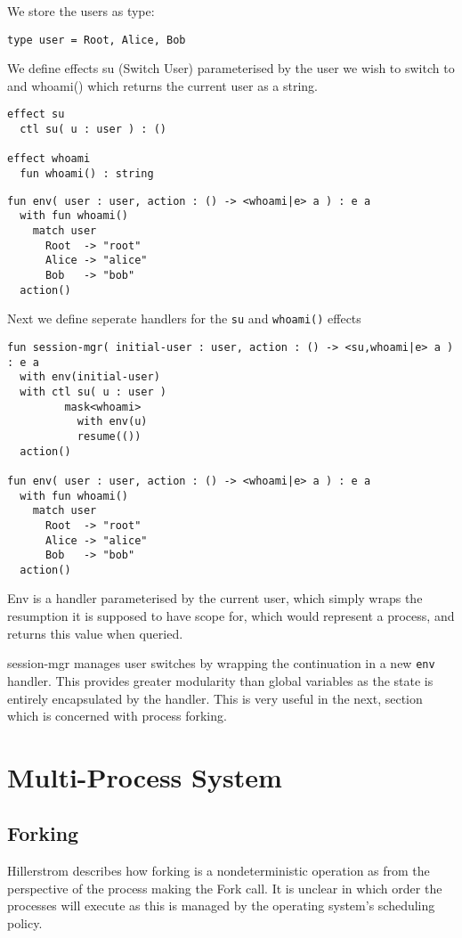 \documentclass[logo,bsc,singlespacing,parskip]{infthesis}
\begin{document}
We store the users as type:
\begin{lstlisting}
type user = Root, Alice, Bob
\end{lstlisting}

We define effects su (Switch User) parameterised by the user we wish to switch to and whoami() which returns the current user as a string.
\begin{lstlisting}
effect su
  ctl su( u : user ) : ()

effect whoami
  fun whoami() : string
\end{lstlisting}


\begin{lstlisting}
fun env( user : user, action : () -> <whoami|e> a ) : e a
  with fun whoami() 
    match user
      Root  -> "root"
      Alice -> "alice"
      Bob   -> "bob"
  action()
\end{lstlisting}

Next we define seperate handlers for the \texttt{su} and \texttt{whoami()} effects 
\begin{lstlisting}
fun session-mgr( initial-user : user, action : () -> <su,whoami|e> a ) : e a
  with env(initial-user)
  with ctl su( u : user )
         mask<whoami>
           with env(u)
           resume(())
  action()

fun env( user : user, action : () -> <whoami|e> a ) : e a
  with fun whoami() 
    match user
      Root  -> "root"
      Alice -> "alice"
      Bob   -> "bob"
  action()
\end{lstlisting}

Env is a handler parameterised by the current user, which simply wraps the resumption it is supposed to have scope for, which would represent a process, and returns this value when queried. 

session-mgr manages user switches by wrapping the continuation in a new \texttt{env} handler. This provides greater modularity than global variables as the state is entirely encapsulated by the handler. This is very useful in the next, section which is concerned with process forking.

\section{Multi-Process System}
\subsection*{Forking}
Hillerstrom describes how forking is a nondeterministic operation as from the perspective of the process making the Fork call. It is unclear in which order the processes will execute as this is managed by the operating system's scheduling policy. 
\end{document}
